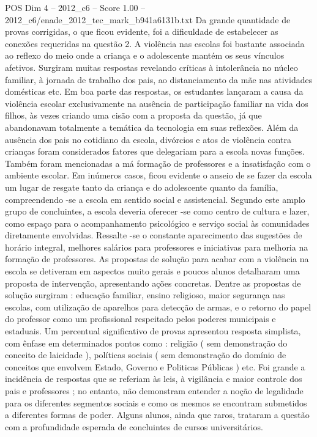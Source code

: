 \begin{textsample}{POS Dim 4 – 2012\_c6 – Score 1.00 – 2012\_c6/enade\_2012\_tec\_mark\_b941a6131b.txt}
Da grande quantidade de provas corrigidas, o que ficou evidente, foi a dificuldade de estabelecer as conexões requeridas na questão 2.
A violência nas escolas foi bastante associada ao reflexo do meio onde a criança e o adolescente mantém os seus vínculos afetivos.
Surgiram muitas respostas revelando críticas à intolerância no núcleo familiar, à jornada de trabalho dos pais, ao distanciamento da mãe nas atividades domésticas etc.
Em boa parte das respostas, os estudantes lançaram a causa da violência escolar exclusivamente na ausência de participação familiar na vida dos filhos, às vezes criando uma cisão com a proposta da questão, já que abandonavam totalmente a temática da tecnologia em suas reflexões.
Além da ausência dos pais no cotidiano da escola, divórcios e atos de violência contra crianças foram considerados fatores que delegariam para a escola novas funções.
Também foram mencionadas a má formação de professores e a insatisfação com o ambiente escolar.
Em inúmeros casos, ficou evidente o anseio de se fazer da escola um lugar de resgate tanto da criança e do adolescente quanto da família, compreendendo -se a escola em sentido social e assistencial.
Segundo este amplo grupo de concluintes, a escola deveria oferecer -se como centro de cultura e lazer, como espaço para o acompanhamento psicológico e serviço social às comunidades diretamente envolvidas.
Ressalte -se o constante aparecimento das sugestões de horário integral, melhores salários para professores e iniciativas para melhoria na formação de professores.
As propostas de solução para acabar com a violência na escola se detiveram em aspectos muito gerais e poucos alunos detalharam uma proposta de intervenção, apresentando ações concretas.
Dentre as propostas de solução surgiram : educação familiar, ensino religioso, maior segurança nas escolas, com utilização de aparelhos para detecção de armas, e o retorno do papel do professor como um profissional respeitado pelos poderes municipais e estaduais.
Um percentual significativo de provas apresentou resposta simplista, com ênfase em determinados pontos como : religião ( sem demonstração do conceito de laicidade ), políticas sociais ( sem demonstração do domínio de conceitos que envolvem Estado, Governo e Politicas Públicas ) etc.
Foi grande a incidência de respostas que se referiam às leis, à vigilância e maior controle dos pais e professores ; no entanto, não demonstram entender a noção de legalidade para os diferentes segmentos sociais e como os mesmos se encontram submetidos a diferentes formas de poder.
Alguns alunos, ainda que raros, trataram a questão com a profundidade esperada de concluintes de cursos universitários.

\end{textsample}
